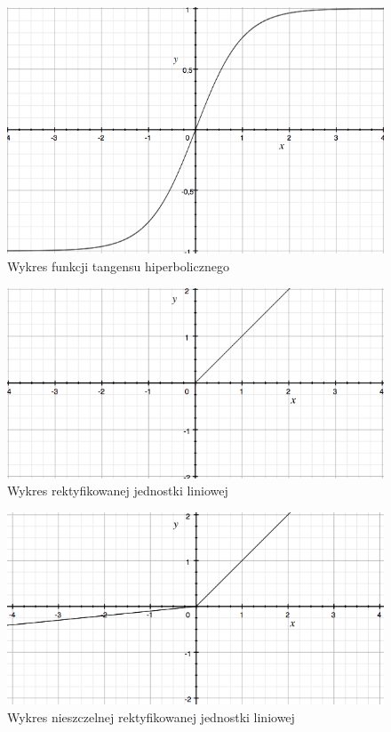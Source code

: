 \documentclass[12pt,a4paper,twoside,titlepage,openright]{book}
\begin{document}
\begin{figure}[ht]
	\centering
			\includegraphics[resolution=100, scale=0.7]{Tangens.png}
		\caption{Wykres funkcji tangensu hiperbolicznego}
\end{figure}

\begin{figure}[ht]
	\centering
			\includegraphics[resolution=100, scale=0.8]{ReLU.png}
		\caption{Wykres rektyfikowanej jednostki liniowej}
\end{figure}

\begin{figure}[ht]
	\centering
			\includegraphics[resolution=100, scale=0.8]{leakyReLU.png}
		\caption{Wykres nieszczelnej rektyfikowanej jednostki liniowej}
\end{figure}
\end{document}
